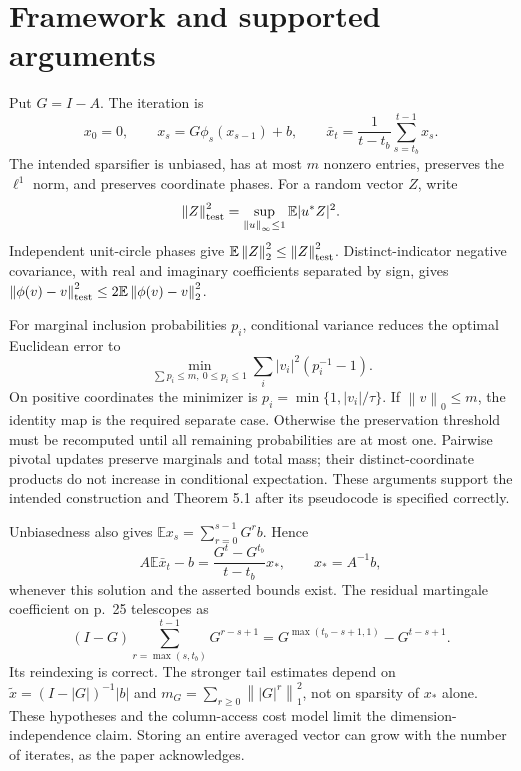 \documentclass[10pt]{article}
\begin{document}
\section*{Framework and supported arguments}
Put \(G=I-A\). The iteration is \[x_0=0,\qquad x_s=G\phi_s(x_{s-1})+b,\qquad
 \bar x_t=\frac1{t-t_b}\sum_{s=t_b}^{t-1}x_s.\] The intended sparsifier is unbiased, has at most \(m\) nonzero entries, preserves the \(\ell^1\) norm, and preserves coordinate phases. For a random vector \(Z\), write \[\left\lVert Z\right\rVert_{\rm test}^2=\sup_{\left\lVert u\right\rVert_\infty\le1}\mathbb E|u^*Z|^2.\] Independent unit-circle phases give \(\mathbb E\left\lVert Z\right\rVert_2^2\le\left\lVert Z\right\rVert_{\rm test}^2\). Distinct-indicator negative covariance, with real and imaginary coefficients separated by sign, gives \(\left\lVert\phi(v)-v\right\rVert_{\rm test}^2\le2\mathbb E\left\lVert\phi(v)-v\right\rVert_2^2\).\par
For marginal inclusion probabilities \(p_i\), conditional variance reduces the optimal Euclidean error to \[\min_{\sum p_i\le m,\ 0\le p_i\le1}
       \sum_i |v_i|^2(p_i^{-1}-1).\] On positive coordinates the minimizer is \(p_i=\min\{1,|v_i|/\tau\}\). If \(\left\lVert v\right\rVert_0\le m\), the identity map is the required separate case. Otherwise the preservation threshold must be recomputed until all remaining probabilities are at most one. Pairwise pivotal updates preserve marginals and total mass; their distinct-coordinate products do not increase in conditional expectation. These arguments support the intended construction and Theorem 5.1 after its pseudocode is specified correctly.\par
Unbiasedness also gives \(\mathbb Ex_s=\sum_{r=0}^{s-1}G^rb\). Hence \[A\mathbb E\bar x_t-b=\frac{G^t-G^{t_b}}{t-t_b}x_*,
 \qquad x_*=A^{-1}b,\] whenever this solution and the asserted bounds exist. The residual martingale coefficient on p. 25 telescopes as \[(I-G)\sum_{r=\max(s,t_b)}^{t-1}G^{r-s+1}
 =G^{\max(t_b-s+1,1)}-G^{t-s+1}.\] Its reindexing is correct. The stronger tail estimates depend on \(\widetilde x=(I-|G|)^{-1}|b|\) and \(m_G=\sum_{r\ge0}\left\lVert|G|^r\right\rVert_1^2\), not on sparsity of \(x_*\) alone. These hypotheses and the column-access cost model limit the dimension-independence claim. Storing an entire averaged vector can grow with the number of iterates, as the paper acknowledges.\par
\end{document}
